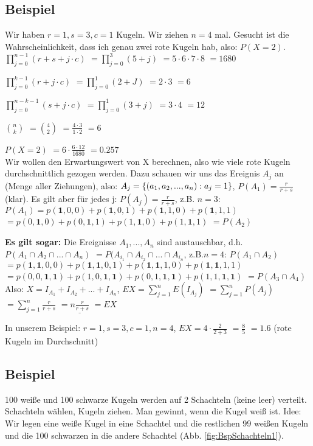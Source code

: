 \renewcommand{\ldate}{2015-11-10}

\subsection{Beispiel}
Wir haben $r=1, s=3, c=1$ Kugeln. Wir ziehen $n=4$ mal. Gesucht ist die Wahrscheinlichkeit, dass ich genau zwei rote Kugeln hab, also: $P(X=2)$.
$ \prod_{j=0}^{n-1} (r+s+j\cdot c)$
$=\prod_{j=0}^{3} (5+j)$
$=5\cdot 6\cdot 7\cdot 8$
$=1680$

$\prod_{j=0}^{k-1} (r+j\cdot c)$
$=\prod_{j=0}^{1} (2+J)$
$=2\cdot 3$
$=6$

$\prod_{j=0}^{n-k-1} (s+j\cdot c)$
$=\prod_{j=0}^{1} (3+j)$
$=3\cdot 4$
$=12$

$\binom n k $
$=\binom 4 2$
$=\frac{4\cdot 3}{1\cdot 2}$
$=6$

$P(X=2)$
$=6 \cdot \frac{6\cdot 12}{1680}$
$=0.257$\\

Wir wollen den Erwartungswert von X berechnen, also wie viele rote Kugeln durchschnittlich gezogen werden. Dazu schauen wir uns das Ereignis $A_j$ an (Menge aller Ziehungen), also: $A_j= \left\lbrace (a_1,a_2,...,a_n) : a_j=1 \right\rbrace $, 
$P(A_1) = \frac{r}{r+s}$ (klar). Es gilt aber für jedes j: 
$P(A_j) = \frac{r}{r+s}$, z.B. $n=3$: 
$P(A_1) = p(\textbf{1},0,0) + p(\textbf{1},0,1) + p(\textbf{1},1,0) + p(\textbf{1},1,1)$
$=p(0,\textbf{1},0) + p(0,\textbf{1},1) + p(1,\textbf{1},0) + p(1,\textbf{1},1) $
$=P(A_2)$

\textbf{Es gilt sogar:} Die Ereignisse $A_1, ..., A_n$ sind austauschbar, d.h. 
$P(A_1\cap A_2\cap ... \cap A_n)$
$=P(A_{i_1}\cap A_{i_2}\cap ... \cap A_{i_n}$, 
z.B.$n=4$: 
$P(A_1\cap A_2)$
$=p(\textbf{1},\textbf{1},0,0) + p(\textbf{1},\textbf{1},0,1) + p(\textbf{1},\textbf{1},1,0) + p(\textbf{1},\textbf{1},1,1) $
$=p(0,0,\textbf{1},\textbf{1}) + p(1,0,\textbf{1},\textbf{1}) + p(0,1,\textbf{1},\textbf{1}) + p(1,1,\textbf{1},\textbf{1}) $
$=P(A_3\cap A_4)$\\

Also: $X=I_{A_1} + I_{A_2} + ... + I_{A_n} $,
$ E X = \sum_{j=1}^{n} E(I_{A_j})$
$ = \sum_{j=1}^{n} P(A_j)$
$= \sum_{j=1}^{n} \frac{r}{r+s}$
$=\underline{n \frac{r}{r+s}} $
$= E X $

In unserem Beispiel: $r=1, s=3, c=1, n=4$, 
$ E X = 4\cdot \frac{2}{2+3}$
$=\frac{8}{5}$
$=1.6$ (rote Kugeln im Durchschnitt) 

\subsection{Beispiel}
100 weiße und 100 schwarze Kugeln werden auf 2 Schachteln (keine leer) verteilt. Schachteln wählen, Kugeln ziehen. Man gewinnt, wenn die Kugel weiß ist. 
Idee: Wir legen eine weiße Kugel in eine Schachtel und die restlichen 99 weißen Kugeln und die 100 schwarzen in die andere Schachtel (Abb. \ref{fig:BspSchachteln1}).

